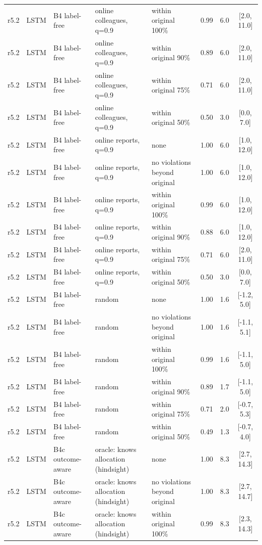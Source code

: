 \documentclass[10pt,onecolumn,letterpaper]{article}
\begin{document}
\begin{longtable}{lllp{4.2cm}p{3.4cm}ccc}
r5.2 & LSTM & B4 label-free & online colleagues, q=0.9 & within original 100\% & 0.99 & 6.0 & [2.0, 11.0] \\
r5.2 & LSTM & B4 label-free & online colleagues, q=0.9 & within original 90\% & 0.89 & 6.0 & [2.0, 11.0] \\
r5.2 & LSTM & B4 label-free & online colleagues, q=0.9 & within original 75\% & 0.71 & 6.0 & [2.0, 11.0] \\
r5.2 & LSTM & B4 label-free & online colleagues, q=0.9 & within original 50\% & 0.50 & 3.0 & [0.0, 7.0] \\
r5.2 & LSTM & B4 label-free & online reports, q=0.9 & none & 1.00 & 6.0 & [1.0, 12.0] \\
r5.2 & LSTM & B4 label-free & online reports, q=0.9 & no violations beyond original & 1.00 & 6.0 & [1.0, 12.0] \\
r5.2 & LSTM & B4 label-free & online reports, q=0.9 & within original 100\% & 0.99 & 6.0 & [1.0, 12.0] \\
r5.2 & LSTM & B4 label-free & online reports, q=0.9 & within original 90\% & 0.88 & 6.0 & [1.0, 12.0] \\
r5.2 & LSTM & B4 label-free & online reports, q=0.9 & within original 75\% & 0.71 & 6.0 & [2.0, 11.0] \\
r5.2 & LSTM & B4 label-free & online reports, q=0.9 & within original 50\% & 0.50 & 3.0 & [0.0, 7.0] \\
r5.2 & LSTM & B4 label-free & random & none & 1.00 & 1.6 & [-1.2, 5.0] \\
r5.2 & LSTM & B4 label-free & random & no violations beyond original & 1.00 & 1.6 & [-1.1, 5.1] \\
r5.2 & LSTM & B4 label-free & random & within original 100\% & 0.99 & 1.6 & [-1.1, 5.0] \\
r5.2 & LSTM & B4 label-free & random & within original 90\% & 0.89 & 1.7 & [-1.1, 5.0] \\
r5.2 & LSTM & B4 label-free & random & within original 75\% & 0.71 & 2.0 & [-0.7, 5.3] \\
r5.2 & LSTM & B4 label-free & random & within original 50\% & 0.49 & 1.3 & [-0.7, 4.0] \\
r5.2 & LSTM & B4c outcome-aware & oracle: knows allocation (hindsight) & none & 1.00 & 8.3 & [2.7, 14.3] \\
r5.2 & LSTM & B4c outcome-aware & oracle: knows allocation (hindsight) & no violations beyond original & 1.00 & 8.3 & [2.7, 14.7] \\
r5.2 & LSTM & B4c outcome-aware & oracle: knows allocation (hindsight) & within original 100\% & 0.99 & 8.3 & [2.3, 14.3] \\

\end{longtable}
\end{document}

